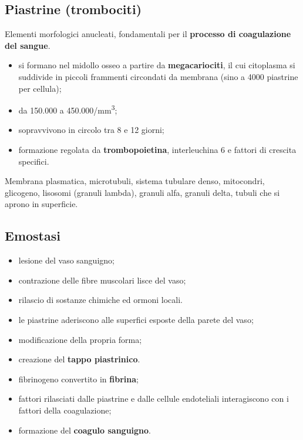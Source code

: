 \subsection{Piastrine (trombociti)}

Elementi morfologici anucleati, fondamentali per il \textbf{processo di coagulazione del sangue}.
\begin{itemize}
  \item si formano nel midollo osseo a partire da \textbf{megacariociti}, il cui citoplasma si suddivide in piccoli frammenti circondati da membrana (sino a 4000 piastrine per cellula);
  \item da 150.000 a 450.000/mm\textsuperscript{3};
  \item sopravvivono in circolo tra 8 e 12 giorni;
  \item formazione regolata da \textbf{trombopoietina}, interleuchina 6 e fattori di crescita specifici.
\end{itemize}

Membrana plasmatica, microtubuli, sistema tubulare denso, mitocondri, glicogeno, lisosomi (granuli lambda), granuli alfa, granuli delta, tubuli che si aprono in superficie.

\subsection{Emostasi}

\begin{itemize}
  \item lesione del vaso sanguigno;
  \item contrazione delle fibre muscolari lisce del vaso;
  \item rilascio di sostanze chimiche ed ormoni locali.
\end{itemize}

\begin{itemize}
  \item le piastrine aderiscono alle superfici esposte della parete del vaso;
  \item modificazione della propria forma;
  \item creazione del \textbf{tappo piastrinico}.
\end{itemize}

\begin{itemize}
  \item fibrinogeno convertito in \textbf{fibrina};
  \item fattori rilasciati dalle piastrine e dalle cellule endoteliali interagiscono con i fattori della coagulazione;
  \item formazione del \textbf{coagulo sanguigno}.
\end{itemize}

